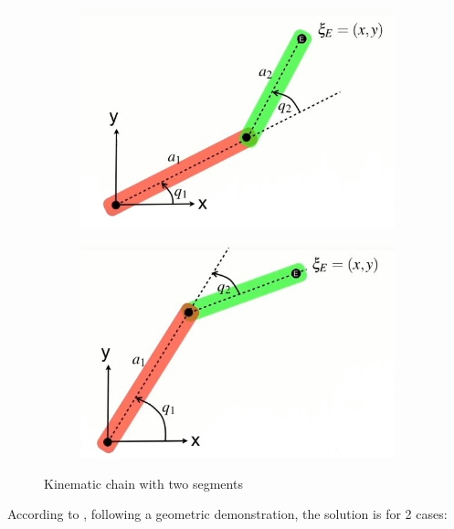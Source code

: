 \documentclass[runningheads,a4paper,12pt]{report}
\begin{document}
\begin{figure}[h]
	\centering
	\begin{subfigure}{.45\textwidth}
  		\centering
  		\includegraphics[width=\linewidth]{./images/1_inverse_kinematics}
  		\caption{}
  		\label{fig:ik_a}
  	\end{subfigure} 
  	\hfill  
  	\begin{subfigure}{.45\textwidth}
  		\centering
  		\includegraphics[width=\linewidth]{./images/1_inverse_kinematics2}
  		\caption{}
  		\label{fig:ik_b}
  	\end{subfigure} 
  	\caption{Kinematic chain with two segments}
  	\label{fig:1_ik}
\end{figure}

According to \cite{ik}, following a geometric demonstration, the solution is for 2 cases:
\end{document}

